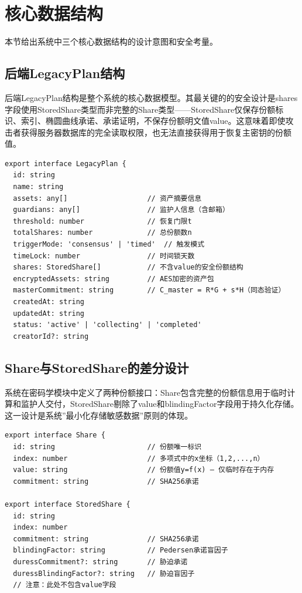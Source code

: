 \documentclass[UTF8,a4paper,zihao=-4,openany]{ctexrep}
\begin{document}
\section{核心数据结构}

本节给出系统中三个核心数据结构的设计意图和安全考量。

\subsection{后端LegacyPlan结构}

后端LegacyPlan结构是整个系统的核心数据模型。其最关键的的安全设计是shares字段使用StoredShare类型而非完整的Share类型——StoredShare仅保存份额标识、索引、椭圆曲线承诺、承诺证明，不保存份额明文值value。这意味着即使攻击者获得服务器数据库的完全读取权限，也无法直接获得用于恢复主密钥的份额值。

\begin{lstlisting}[caption={后端计划核心结构定义 (legacyPlanService.ts:45-61)}]
export interface LegacyPlan {
  id: string
  name: string
  assets: any[]                   // 资产摘要信息
  guardians: any[]                // 监护人信息（含邮箱）
  threshold: number               // 恢复门限t
  totalShares: number             // 总份额数n
  triggerMode: 'consensus' | 'timed'  // 触发模式
  timeLock: number                // 时间锁天数
  shares: StoredShare[]           // 不含value的安全份额结构
  encryptedAssets: string         // AES加密的资产包
  masterCommitment: string        // C_master = R*G + s*H（同态验证）
  createdAt: string
  updatedAt: string
  status: 'active' | 'collecting' | 'completed'
  creatorId?: string
\end{lstlisting}

\subsection{Share与StoredShare的差分设计}

系统在密码学模块中定义了两种份额接口：Share包含完整的份额信息用于临时计算和监护人交付，StoredShare剔除了value和blindingFactor字段用于持久化存储。这一设计是系统”最小化存储敏感数据”原则的体现。

\begin{lstlisting}[caption={Share与StoredShare接口定义 (shamir.ts:6-20)}]
export interface Share {
  id: string                      // 份额唯一标识
  index: number                   // 多项式中的x坐标（1,2,...,n）
  value: string                   // 份额值y=f(x) — 仅临时存在于内存
  commitment: string              // SHA256承诺

export interface StoredShare {
  id: string
  index: number
  commitment: string              // SHA256承诺
  blindingFactor: string          // Pedersen承诺盲因子
  duressCommitment?: string       // 胁迫承诺
  duressBlindingFactor?: string   // 胁迫盲因子
  // 注意：此处不包含value字段
\end{lstlisting}
\end{document}
